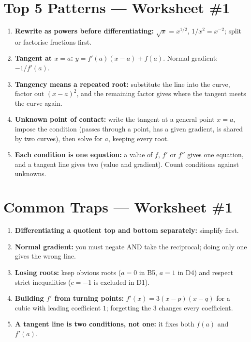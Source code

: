 \documentclass[11pt,a4paper]{article}
\begin{document}
\section*{Top 5 Patterns --- Worksheet \#1}
\begin{enumerate}[leftmargin=2em,itemsep=4pt]
  \item \textbf{Rewrite as powers before differentiating:} $\sqrt{x}=x^{1/2}$, $1/x^2=x^{-2}$; split or factorise fractions first. 
  \item \textbf{Tangent at $x=a$:} $y=f'(a)(x-a)+f(a)$. Normal gradient: $-1/f'(a)$. 
  \item \textbf{Tangency means a repeated root:} substitute the line into the curve, factor out $(x-a)^2$, and the remaining factor gives where the tangent meets the curve again. 
  \item \textbf{Unknown point of contact:} write the tangent at a general point $x=a$, impose the condition (passes through a point, has a given gradient, is shared by two curves), then solve for $a$, keeping every root. 
  \item \textbf{Each condition is one equation:} a value of $f$, $f'$ or $f''$ gives one equation, and a tangent line gives two (value and gradient). Count conditions against unknowns. 
\end{enumerate}

\section*{Common Traps --- Worksheet \#1}
\begin{enumerate}[leftmargin=2em,itemsep=4pt]
  \item \textbf{Differentiating a quotient top and bottom separately:} simplify first. 
  \item \textbf{Normal gradient:} you must negate AND take the reciprocal; doing only one gives the wrong line. 
  \item \textbf{Losing roots:} keep obvious roots ($a=0$ in B5, $a=1$ in D4) and respect strict inequalities ($c=-1$ is excluded in D1). 
  \item \textbf{Building $f'$ from turning points:} $f'(x)=3(x-p)(x-q)$ for a cubic with leading coefficient $1$; forgetting the $3$ changes every coefficient. 
  \item \textbf{A tangent line is two conditions, not one:} it fixes both $f(a)$ and $f'(a)$. 
\end{enumerate}

\end{document}
